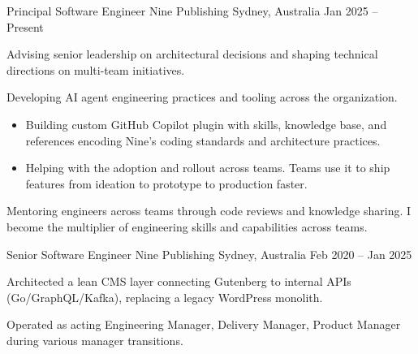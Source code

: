 

\begin{cventries}

  \cventry
    {Principal Software Engineer} %
    {Nine Publishing} %
    {Sydney, Australia} %
    {Jan 2025 -- Present} %
    {
      \begin{cvitems}
        \item {Advising senior leadership on architectural decisions and shaping technical directions on multi-team initiatives.}
        \item {Developing AI agent engineering practices and tooling across the organization.}
            \begin{itemize}
                \item {Building custom GitHub Copilot plugin with skills, knowledge base, and references encoding Nine's coding standards and architecture practices.}
                \item {Helping with the adoption and rollout across teams. Teams use it to ship features from ideation to prototype to production faster.}
            \end{itemize}
        \item {Mentoring engineers across teams through code reviews and knowledge sharing. I become the multiplier of engineering skills and capabilities across teams.}
      \end{cvitems}
    }

  \cventry
    {Senior Software Engineer} %
    {Nine Publishing} %
    {Sydney, Australia} %
    {Feb 2020 -- Jan 2025} %
    {
      \begin{cvitems}
        \item {Architected a lean CMS layer connecting Gutenberg to internal APIs (Go/GraphQL/Kafka), replacing a legacy WordPress monolith.}
        \item {Operated as acting Engineering Manager, Delivery Manager, Product Manager during various manager transitions.}
      \end{cvitems}
    }


\end{cventries}
